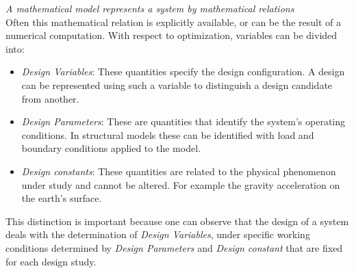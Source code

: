 \textit{A mathematical model represents a system by mathematical relations\cite{papalambros2000principles}}\\
Often this mathematical relation is explicitly available, or can be the result of a numerical computation.
With respect to optimization, variables can be divided into:
\begin{itemize}
\item \textit{Design Variables}: These quantities specify the design configuration. A design can be represented using such a variable to distinguish a design candidate from another.
\item \textit{Design Parameters}: These are quantities that identify the system's operating conditions. In structural models these can be identified with load and boundary conditions applied to the model.
\item \textit{Design constants}: 
These quantities are related to the physical phenomenon under study and cannot be altered. For example the gravity acceleration on the earth's surface. 
\end{itemize} 
This distinction is important because one can observe that the design of a system deals with the determination of \textit{Design Variables}, under specific working conditions determined by \textit{Design Parameters} and  \textit{Design constant} that are fixed for each design study.
